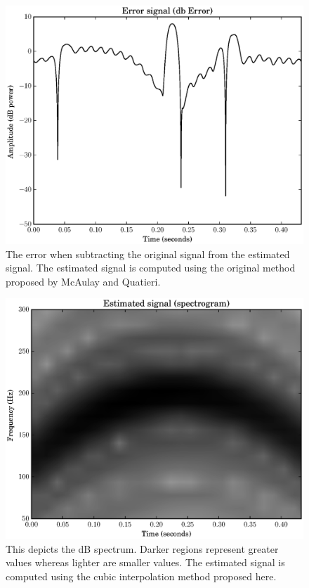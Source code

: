 \documentclass[letterpaper,12pt]{report}
\begin{document}
\begin{figure}
    \includegraphics[width=\textwidth]{plots/mq_cubic_error.eps}
    \caption{
        The error when subtracting the original signal from the estimated
        signal. The estimated signal is computed using the original method
        proposed by McAulay and Quatieri.
    \label{plot:mqcubicerror}}
\end{figure}


\begin{figure}
    \includegraphics[width=\textwidth]{plots/mq_mod_cubic_estimated_spec.eps}
    \caption{This depicts the dB spectrum. Darker regions represent greater
        values whereas lighter are smaller values. The estimated signal is
        computed using the cubic interpolation method proposed here.
    \label{plot:mqmodcubicestimatedspec}}
\end{figure}
\end{document}

